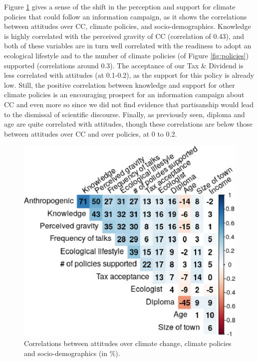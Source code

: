 \documentclass[english,5p,authoryear]{elsarticle}
\begin{document}

Figure \ref{fig:correlations} gives a sense of the shift in the perception and support for climate policies that could follow an information campaign, as it shows the correlations between attitudes over CC, climate policies, and socio-demographics. Knowledge is highly correlated with the perceived gravity of CC (correlation of 0.43), and both of these variables are in turn well correlated with the readiness to adopt an ecological lifestyle and to the number of climate policies (of Figure \ref{fig:policies}) supported (correlations around 0.3). The acceptance of our Tax \& Dividend is less correlated with attitudes (at 0.1-0.2), as the support for this policy is already low. Still, the positive correlation between knowledge and support for other climate policies is an encouraging prospect for an information campaign about CC and even more so since we did not find evidence that partisanship would lead to the dismissal of scientific discourse. Finally, as previously seen, diploma and age are quite correlated with attitudes, though these correlations are below those between attitudes over CC and over policies, at 0 to 0.2. 

\begin{figure}[!htbp]
\centering
\includegraphics[width=0.95\columnwidth]{Images_EPS/correlation_matrix2.eps}
\caption{Correlations between attitudes over climate change, climate policies and socio-demographics (in \%).}
\label{fig:correlations}
\end{figure}
\end{document}
